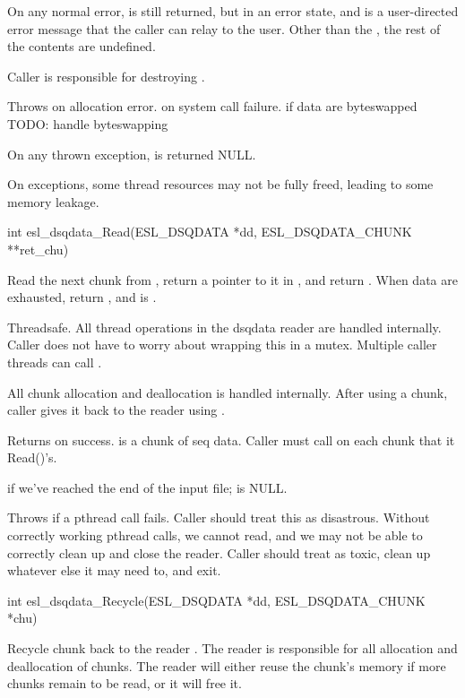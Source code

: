 \begin{sreapi}
On any normal error,  is still returned, but in
an error state, and  is a user-directed
error message that the caller can relay to the user. Other
than the , the rest of the contents are undefined.

Caller is responsible for destroying .

Throws  on allocation error.
 on system call failure.
 if data are byteswapped
TODO: handle byteswapping

On any thrown exception,  is returned NULL.

On  exceptions, some thread resources may
not be fully freed, leading to some memory leakage.


\hypertarget{func:esl_dsqdata_Read()}
{\item[int esl\_dsqdata\_Read(ESL\_DSQDATA *dd, ESL\_DSQDATA\_CHUNK **ret\_chu)]}

Read the next chunk from , return a pointer to it in
, and return . When data are exhausted,
return , and  is . 

Threadsafe. All thread operations in the dsqdata reader
are handled internally. Caller does not have to worry
about wrapping this in a mutex. Multiple caller threads
can call .

All chunk allocation and deallocation is handled
internally. After using a chunk, caller gives it back to
the reader using .

Returns  on success.  is a chunk of seq data.
Caller must call  on each chunk
that it Read()'s.

 if we've reached the end of the input file;
 is NULL.

Throws  if a pthread call fails. 
Caller should treat this as disastrous. Without correctly
working pthread calls, we cannot read, and we may not be able
to correctly clean up and close the reader. Caller should
treat  as toxic, clean up whatever else it may need to,
and exit.


\hypertarget{func:esl_dsqdata_Recycle()}
{\item[int esl\_dsqdata\_Recycle(ESL\_DSQDATA *dd, ESL\_DSQDATA\_CHUNK *chu)]}

Recycle chunk  back to the reader .  The reader
is responsible for all allocation and deallocation of
chunks. The reader will either reuse the chunk's memory
if more chunks remain to be read, or it will free it.


\end{sreapi}
